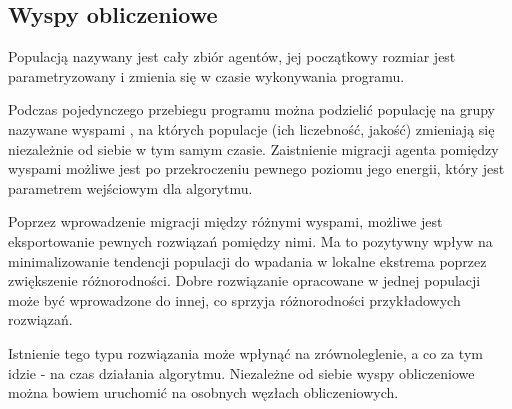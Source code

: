 
\subsection{Wyspy obliczeniowe}
Populacją nazywany jest cały zbiór agentów, jej początkowy rozmiar jest parametryzowany i zmienia się w czasie wykonywania programu.

Podczas pojedynczego przebiegu programu można podzielić populację na grupy nazywane wyspami \cite{emas3}, na których populacje (ich liczebność, jakość) zmieniają się niezależnie od siebie w tym samym czasie. Zaistnienie migracji agenta pomiędzy wyspami możliwe jest po przekroczeniu pewnego poziomu jego energii, który jest parametrem wejściowym dla algorytmu.

Poprzez wprowadzenie migracji między różnymi wyspami, możliwe jest eksportowanie pewnych rozwiązań pomiędzy nimi. Ma to pozytywny wpływ na minimalizowanie tendencji populacji do wpadania w lokalne ekstrema poprzez zwiększenie różnorodności. Dobre rozwiązanie opracowane w jednej populacji może być wprowadzone do innej, co sprzyja różnorodności przykładowych rozwiązań. 

Istnienie tego typu rozwiązania może wpłynąć na zrównoleglenie, a co za tym idzie - na czas działania algorytmu. Niezależne od siebie wyspy obliczeniowe można bowiem uruchomić na osobnych węzłach obliczeniowych.



